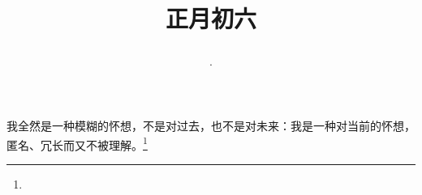 \title{\date[d=15,m=2,y=2024][year:cn-y,年,month:cn,day:cn,日,·,weekday]·正月初六 }
我全然是一种模糊的怀想，不是对过去，也不是对未来：我是一种对当前的怀想，匿名、冗长而又不被理解。\footnote{ }

